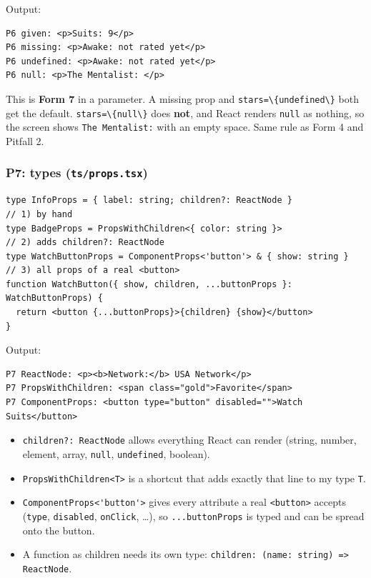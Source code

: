 \documentclass[
  10pt,
]{article}
\newcommand{\passthrough}[1]{#1}
\providecommand{\tightlist}{%
  \setlength{\itemsep}{0pt}\setlength{\parskip}{0pt}}
\begin{document}
Output:

\begin{lstlisting}
P6 given: <p>Suits: 9</p>
P6 missing: <p>Awake: not rated yet</p>
P6 undefined: <p>Awake: not rated yet</p>
P6 null: <p>The Mentalist: </p>
\end{lstlisting}

This is \textbf{Form 7} in a parameter. A missing prop and
\passthrough{\lstinline!stars=\{undefined\}!} both get the default.
\passthrough{\lstinline!stars=\{null\}!} does \textbf{not}, and React
renders \passthrough{\lstinline!null!} as nothing, so the screen shows
\passthrough{\lstinline!The Mentalist:!} with an empty space. Same rule
as Form 4 and Pitfall 2.

\hypertarget{p7-types-tsprops.tsx}{%
\subsubsection{\texorpdfstring{P7: types
(\texttt{ts/props.tsx})}{P7: types (ts/props.tsx)}}\label{p7-types-tsprops.tsx}}

\begin{lstlisting}
type InfoProps = { label: string; children?: ReactNode }               // 1) by hand
type BadgeProps = PropsWithChildren<{ color: string }>                 // 2) adds children?: ReactNode
type WatchButtonProps = ComponentProps<'button'> & { show: string }    // 3) all props of a real <button>
function WatchButton({ show, children, ...buttonProps }: WatchButtonProps) {
  return <button {...buttonProps}>{children} {show}</button>
}
\end{lstlisting}

Output:

\begin{lstlisting}
P7 ReactNode: <p><b>Network:</b> USA Network</p>
P7 PropsWithChildren: <span class="gold">Favorite</span>
P7 ComponentProps: <button type="button" disabled="">Watch Suits</button>
\end{lstlisting}

\begin{itemize}
\tightlist
\item
  \passthrough{\lstinline!children?: ReactNode!} allows everything React
  can render (string, number, element, array,
  \passthrough{\lstinline!null!}, \passthrough{\lstinline!undefined!},
  boolean).
\item
  \passthrough{\lstinline!PropsWithChildren<T>!} is a shortcut that adds
  exactly that line to my type \passthrough{\lstinline!T!}.
\item
  \passthrough{\lstinline!ComponentProps<'button'>!} gives every
  attribute a real \passthrough{\lstinline!<button>!} accepts
  (\passthrough{\lstinline!type!}, \passthrough{\lstinline!disabled!},
  \passthrough{\lstinline!onClick!}, \ldots), so
  \passthrough{\lstinline!...buttonProps!} is typed and can be spread
  onto the button.
\item
  A function as children needs its own type:
  \passthrough{\lstinline!children: (name: string) => ReactNode!}.
\end{itemize}
\end{document}
